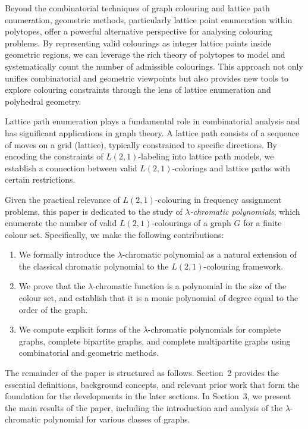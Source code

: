 \documentclass{birkjour}
\theoremstyle{definition}
\theoremstyle{remark}
\numberwithin{equation}{section}
\begin{document}
Beyond the combinatorial techniques of graph colouring and lattice path enumeration, geometric methods, particularly lattice point enumeration within polytopes, offer a powerful alternative perspective for analysing colouring problems. By representing valid colourings as integer lattice points inside geometric regions, we can leverage the rich theory of polytopes to model and systematically count the number of admissible colourings. This approach not only unifies combinatorial and geometric viewpoints but also provides new tools to explore colouring constraints through the lens of lattice enumeration and polyhedral geometry.

Lattice path enumeration plays a fundamental role in combinatorial analysis and has significant applications in graph theory. A lattice path consists of a sequence of moves on a grid (lattice), typically constrained to specific directions. By encoding the constraints of $L(2,1)$-labeling into lattice path models, we establish a connection between valid $L(2,1)$-colorings and lattice paths with certain restrictions.


Given the practical relevance of $L(2,1)$-colouring in frequency assignment problems, this paper is dedicated to the study of \textit{$\lambda$-chromatic polynomials}, which enumerate the number of valid $L(2,1)$-colourings of a graph $G$ for a finite colour set. Specifically, we make the following contributions:

\begin{enumerate}
    \item We formally introduce the $\lambda$-chromatic polynomial as a natural extension of the classical chromatic polynomial to the $L(2,1)$-colouring framework.
    \item We prove that the $\lambda$-chromatic function is a polynomial in the size of the colour set, and establish that it is a monic polynomial of degree equal to the order of the graph.
    \item We compute explicit forms of the $\lambda$-chromatic polynomials for complete graphs, complete bipartite graphs, and complete multipartite graphs using combinatorial and geometric methods.
\end{enumerate}

The remainder of the paper is structured as follows. Section~2 provides the essential definitions, background concepts, and relevant prior work that form the foundation for the developments in the later sections. In Section~3, we present the main results of the paper, including the introduction and analysis of the $\lambda$-chromatic polynomial for various classes of graphs. 
\end{document}
